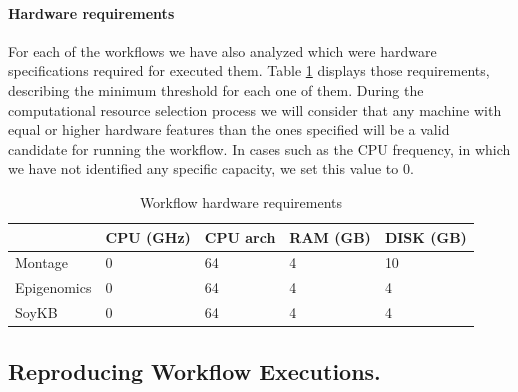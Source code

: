 \paragraph{\textbf{Hardware requirements}}

For each of the workflows we have also analyzed which were hardware specifications required for executed them. Table \ref{tab:hwreqs} displays those requirements, describing the minimum threshold for each one of them. During the computational resource selection process we will consider that any machine with equal or higher hardware features than the ones specified will be a valid candidate for running the workflow. In cases such as the CPU frequency, in which we have not identified any specific capacity, we set this value to 0.



\begin{table}[h]
\begin{tabular}{l|llll}
\multicolumn{1}{c|}{} 
 & CPU (GHz) & CPU arch & RAM (GB) & DISK (GB) \\ \hline
Montage &  0 &  64 & 4 & 10 \\ \hline
Epigenomics &  0 &  64 &  4 & 4  \\ \hline
SoyKB & 0  & 64 & 4 & 4  \\ \hline
\end{tabular}
\caption{Workflow hardware requirements}
\label{tab:hwreqs}
\end{table}

\subsection{Reproducing Workflow Executions.}

